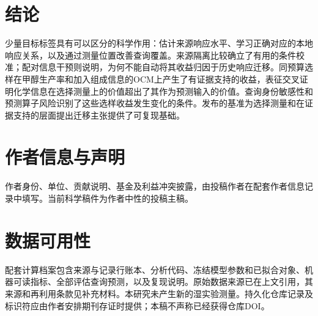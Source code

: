 \documentclass[11pt]{article}
\begin{document}
\section{结论}
少量目标标签具有可以区分的科学作用：估计来源响应水平、学习正确对应的本地响应关系，以及通过测量位置改善查询覆盖。来源隔离比较确立了有用的条件校准；配对信息干预则说明，为何不能自动将其收益归因于历史响应迁移。同预算选样在甲醇生产率和加入组成信息的OCM上产生了有证据支持的收益，表征交叉证明化学信息在选择测量上的价值超出了其作为预测输入的价值。查询身份敏感性和预测算子风险识别了这些选样收益发生变化的条件。发布的基准为选择测量和在证据支持的层面提出迁移主张提供了可复现基础。

\section*{作者信息与声明}
作者身份、单位、贡献说明、基金及利益冲突披露，由投稿作者在配套作者信息记录中填写。当前科学稿件为作者中性的投稿主稿。

\section*{数据可用性}
配套计算档案包含来源与记录行账本、分析代码、冻结模型参数和已拟合对象、机器可读指标、全部评估查询预测，以及复现说明。原始数据来源已在上文引用，其来源和再利用条款见补充材料。本研究未产生新的湿实验测量。持久化仓库记录及标识符应由作者安排期刊存证时提供；本稿不声称已经获得仓库DOI。


\end{document}
